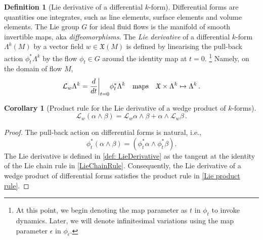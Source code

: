 \documentclass[11pt, oneside]{article}   	%
\numberwithin{equation}{section}
\theoremstyle{plain}
\newtheorem{corollary}[theorem]{Corollary}
\theoremstyle{definition}
\newtheorem{definition}[theorem]{Definition}
\theoremstyle{remark}
\newcommand{\<}{\langle}
\renewcommand{\>}{\rangle}
\begin{document}
\begin{definition}[Lie derivative of a differential $k$-form] 
Differential forms are quantities one integrates, such as line elements, surface elements and volume elements. 
The Lie group $G$ for ideal fluid flows is the manifold of smooth invertible maps, aka \textit{diffeomorphisms}. 
The \emph{Lie derivative} of a differential $k$-form $\Lambda^k(M)$ by a vector field $w\in\mathfrak{X}(M)$ is defined 
by linearising the pull-back action $\phi^*_t\Lambda^k$ by the flow $\phi_t\in G$ around the identity map at $t=0$.%
\footnote{At this point, we begin denoting the map parameter as $t$ in $\phi_t$ to invoke dynamics. 
Later, we will denote infinitesimal variations using the map parameter $\epsilon$ in $\phi_\epsilon$.}
Namely,
on the domain of flow $M$,
\begin{eqnarray}
 \mathcal{L}_w\Lambda^k = \frac{d}{dt}\bigg|_{t=0}\phi^*_t\Lambda^k
\quad\hbox{maps}\quad
\mathfrak{X}\times \Lambda^k \mapsto  \Lambda^k
\,.
\end{eqnarray}
\end{definition}
%
\begin{corollary}[Product rule for the Lie derivative of a wedge product of $k$-forms]   
\begin{equation}
 \mathcal{L}_w(\alpha\wedge\beta)
=
 \mathcal{L}_w\alpha\wedge  \beta
+
\alpha\wedge  \mathcal{L}_w\beta
\,.
\label{Lie product rule}
\end{equation}
\end{corollary}
\begin{proof}
The pull-back action on differential forms is natural, i.e.,
\[
\phi_t^*(\alpha\wedge\beta) = (\phi_t^*\alpha\wedge\phi_t^*\beta).
\]
The Lie derivative is defined in \eqref{def: LieDerivative} as the tangent at the identity of the Lie chain rule in \eqref{LieChainRule}. 
Consequently, the Lie derivative of a wedge product of differential forms satisfies the product rule in \eqref{Lie product rule}.  
\end{proof}
\end{document}
